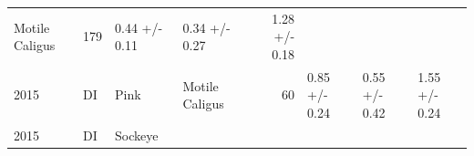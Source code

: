 \documentclass[fleqn,10pt]{wlpeerj} %
\begin{document}
\begin{longtable}[]{@{}llllrlll@{}}
\begin{minipage}[t]{0.11\columnwidth}
Motile Caligus\strut
\end{minipage} & \begin{minipage}[t]{0.04\columnwidth}\raggedleft\strut
179\strut
\end{minipage} & \begin{minipage}[t]{0.14\columnwidth}\raggedright\strut
0.44 +/- 0.11\strut
\end{minipage} & \begin{minipage}[t]{0.14\columnwidth}\raggedright\strut
0.34 +/- 0.27\strut
\end{minipage} & \begin{minipage}[t]{0.14\columnwidth}\raggedright\strut
1.28 +/- 0.18\strut
\end{minipage}\tabularnewline
\begin{minipage}[t]{0.09\columnwidth}\raggedright\strut
2015\strut
\end{minipage} & \begin{minipage}[t]{0.06\columnwidth}\raggedright\strut
DI\strut
\end{minipage} & \begin{minipage}[t]{0.06\columnwidth}\raggedright\strut
Pink\strut
\end{minipage} & \begin{minipage}[t]{0.11\columnwidth}\raggedright\strut
Motile Caligus\strut
\end{minipage} & \begin{minipage}[t]{0.04\columnwidth}\raggedleft\strut
60\strut
\end{minipage} & \begin{minipage}[t]{0.14\columnwidth}\raggedright\strut
0.85 +/- 0.24\strut
\end{minipage} & \begin{minipage}[t]{0.14\columnwidth}\raggedright\strut
0.55 +/- 0.42\strut
\end{minipage} & \begin{minipage}[t]{0.14\columnwidth}\raggedright\strut
1.55 +/- 0.24\strut
\end{minipage}\tabularnewline
\begin{minipage}[t]{0.09\columnwidth}\raggedright\strut
2015\strut
\end{minipage} & \begin{minipage}[t]{0.06\columnwidth}\raggedright\strut
DI\strut
\end{minipage} & \begin{minipage}[t]{0.06\columnwidth}\raggedright\strut
Sockeye\strut
\end{minipage} & \begin{minipage}[t]{0.11\columnwidth}\raggedright\strut

\end{minipage}
\end{longtable}
\end{document}
